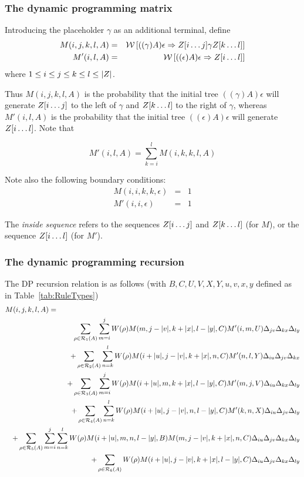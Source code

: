 \documentclass[10pt]{article}
\newcommand{\tabnum}[1]{\ref{tab:#1}}
\newcommand{\tabref}[1]{Table~\tabnum{#1}}
\begin{document}
\subsubsection{The dynamic programming matrix}

\newcommand\m{M}
\newcommand\mtip{\m'}

Introducing the placeholder $\gamma$ as an additional terminal, define
\begin{eqnarray*}
\m(i,j,k,l,A) & = & \seqweight{((\gamma)A)\epsilon}{\outsubseq{i}{j} \gamma \outsubseq{k}{l}} \\
\mtip(i,l,A) & = & \seqweight{((\epsilon)A)\epsilon}{\outsubseq{i}{l}}
\end{eqnarray*}
where $1 \leq i \leq j \leq k \leq l \leq |Z|$.

Thus $\m(i,j,k,l,A)$ is the probability that the initial tree $((\gamma)A)\epsilon$ will generate 
$Z[i \ldots j]$ to the left of $\gamma$ and $Z[k \ldots l]$ to the right of $\gamma$,
whereas $\mtip(i,l,A)$ is the probability that the initial tree $((\epsilon)A)\epsilon$ will generate 
$Z[i \ldots l]$.
Note that

\[
\mtip(i,l,A) = \sum_{k=i}^l \m(i,k,k,l,A)
\]

Note also the following boundary conditions:
\begin{eqnarray*}
\m(i,i,k,k,\epsilon) & = & 1 \\
\mtip(i,i,\epsilon) & = & 1
\end{eqnarray*}

The {\em inside sequence} refers to the sequences $Z[i \ldots j]$ and $Z[k \ldots l]$ (for $\m$),
or the sequence $Z[i \ldots l]$ (for $\mtip$).

\subsubsection{The dynamic programming recursion}

The DP recursion relation is as follows (with $B,C,U,V,X,Y,u,v,x,y$ defined as in \tabref{RuleTypes})
\begin{eqnarray*}
\lefteqn{\m(i,j,k,l,A) =} \\
& &
\sum_{\rho \in \rulesubset{1}{A}} \sum_{m=i}^j W(\rho) \m(m,j-|v|,k+|x|,l-|y|,C) \mtip(i,m,U) \jvmatch \kxmatch \lymatch \\
& & +
\sum_{\rho \in \rulesubset{2}{A}} \sum_{n=k}^l W(\rho) \m(i+|u|,j-|v|,k+|x|,n,C) \mtip(n,l,Y) \iumatch \jvmatch \kxmatch \\
& & +
\sum_{\rho \in \rulesubset{3}{A}} \sum_{m=i}^j W(\rho) \m(i+|u|,m,k+|x|,l-|y|,C) \mtip(m,j,V) \iumatch \kxmatch \lymatch \\
& & +
\sum_{\rho \in \rulesubset{4}{A}} \sum_{n=k}^l W(\rho) \m(i+|u|,j-|v|,n,l-|y|,C) \mtip(k,n,X) \iumatch \jvmatch \lymatch \\
& & +
\sum_{\rho \in \rulesubset{5}{A}} \sum_{m=i}^j \sum_{n=k}^l W(\rho) \m(i+|u|,m,n,l-|y|,B) \m(m,j-|v|,k+|x|,n,C) \iumatch \jvmatch \kxmatch \lymatch \\
& & +
\sum_{\rho \in \rulesubset{6}{A}} W(\rho) \m(i+|u|,j-|v|,k+|x|,l-|y|,C)
 \iumatch \jvmatch \kxmatch \lymatch
\end{eqnarray*}
\end{document}
